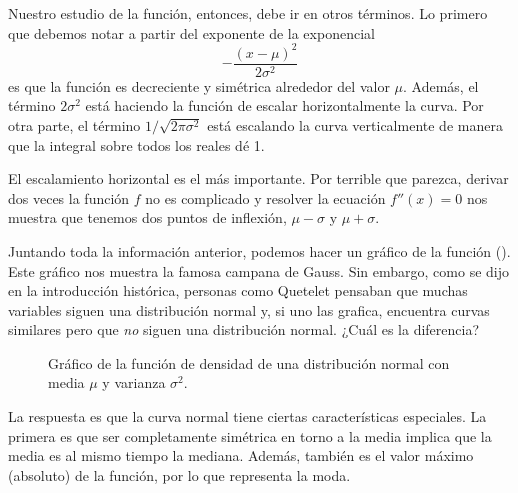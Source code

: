 Nuestro estudio de la función, entonces, debe ir en otros términos. Lo primero que debemos notar a partir del exponente de la exponencial \[-\frac{(x-\mu)^2}{2\sigma^2}\] es que la función es decreciente y simétrica alrededor del valor \(\mu\). Además, el término \(2\sigma^2\) está haciendo la función de escalar horizontalmente la curva. Por otra parte, el término \(1/\sqrt{2\pi\sigma^2}\) está escalando la curva verticalmente de manera que la integral sobre todos los reales dé \num{1}.

El escalamiento horizontal es el más importante. Por terrible que parezca, derivar dos veces la función \(f\) no es complicado y resolver la ecuación \(f''(x)=0\) nos muestra que tenemos dos puntos de inflexión, \(\mu-\sigma\) y \(\mu+\sigma\).

Juntando toda la información anterior, podemos hacer un gráfico de la función (). Este gráfico nos muestra la famosa campana de Gauss. Sin embargo, como se dijo en la introducción histórica, personas como Quetelet pensaban que muchas variables siguen una distribución normal y, si uno las grafica, encuentra curvas similares pero que \emph{no} siguen una distribución normal. ¿Cuál es la diferencia?
\begin{figure}
\caption{Gráfico de la función de densidad de una distribución normal con media \(\mu\) y varianza \(\sigma^2\).}
\end{figure}

La respuesta es que la curva normal tiene ciertas características especiales. La primera es que ser completamente simétrica en torno a la media implica que la media es al mismo tiempo la mediana. Además, también es el valor máximo (absoluto) de la función, por lo que representa la moda. 

